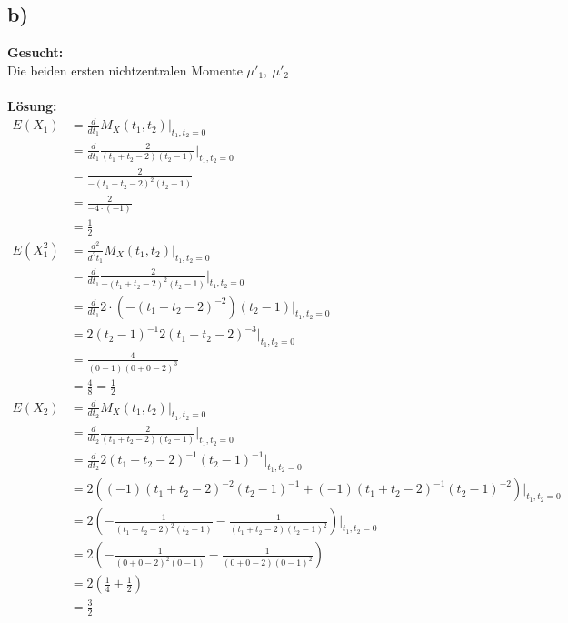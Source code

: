 \documentclass{article}
\begin{document}
\subsection*{b)}
\textbf{Gesucht:}\\

Die beiden ersten nichtzentralen Momente $\mu'_1, ~ \mu'_2$ \\ \\
\textbf{Lösung:} \\
\begin{align*}
    E(X_1) &=  \frac{d}{dt_1} M_X(t_1, t_2) \big|_{t_1, t_2 = 0} \\
    &= \frac{d}{dt_1} \frac{2}{(t_1 + t_2 -2)(t_2 -1 )} \big|_{t_1, t_2 = 0} \\
    &= \frac{2}{-(t_1 + t_2 -2)^2(t_2-1)}\\
    &= \frac{2}{-4 \cdot (-1)} \\
    &= \frac{1}{2} \\
    E(X_1^2) &= \frac{d^2}{d^2t_1} M_X(t_1, t_2) \big|_{t_1, t_2 = 0} \\
    &= \frac{d}{dt_1} \frac{2}{-(t_1 + t_2 -2)^2(t_2-1)} \big|_{t_1, t_2 = 0} \\
    &= \frac{d}{dt_1} 2 \cdot (-(t_1 + t_2 -2)^{-2}) (t_2-1)\big|_{t_1, t_2 = 0} \\
    &= 2 (t_2 - 1)^{-1} 2(t_1 + t_2 - 2)^{-3} \big|_{t_1, t_2 = 0}\\
    &= \frac{4}{(0 - 1) (0 + 0 -2)^{3}}\\
    &= \frac{4}{8} = \frac{1}{2} \\
    E(X_2) &= \frac{d}{dt_2} M_X(t_1, t_2) \big|_{t_1, t_2 = 0} \\
    &= \frac{d}{dt_2} \frac{2}{(t_1 + t_2 -2)(t_2 -1)} \big|_{t_1, t_2 = 0} \\
    &= \frac{d}{dt_2} 2 (t_1 + t_2 -2)^{-1}(t_2 - 1)^{-1} \big|_{t_1, t_2 = 0} \\
    &= 2 ((-1)(t_1 + t_2 -2)^{-2}(t_2 - 1)^{-1} + (-1)(t_1 + t_2 -2)^{-1}(t_2 - 1)^{-2})\big|_{t_1, t_2 = 0}\\
    &= 2 (-\frac{1}{(t_1 + t_2 -2)^2(t_2 - 1)} - \frac{1}{(t_1 + t_2 -2)(t_2 - 1)^{2}} ) \big|_{t_1, t_2 = 0}\\
    &= 2(-\frac{1}{(0 + 0 -2)^2(0 - 1)} - \frac{1}{(0 + 0 -2)(0 - 1)^{2}}) \\
    &= 2(\frac{1}{4} + \frac{1}{2}) \\
    &= \frac{3}{2} \\ \\ \\

\end{align*}
\end{document}
